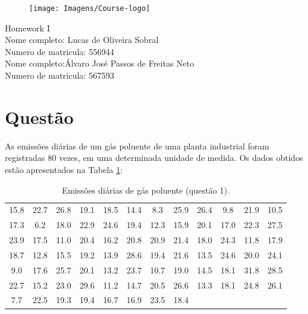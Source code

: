 \documentclass[a4paper,11pt]{article}
\begin{document}
\begin{figure}[!h] \texttt{[image: Imagens/Course-logo]} \end{figure}

\begin{spacing}{1.5}
{\Large\sc \noindent Homework I} \\

{\large\sc \noindent Nome completo: Lucas de Oliveira Sobral}\\
{\large\sc \noindent Numero de matricula: 556944}\\
{\large\sc \noindent Nome completo:Álvaro José Passos de Freitas Neto}\\
{\large\sc \noindent Numero de matricula: 567593}
\end{spacing}

\vskip1cm

\section{Questão}  \label{sec:q1}
As emissões diárias de um gás poluente de uma planta industrial foram registradas 80
vezes, em uma determinada unidade de medida. Os dados obtidos estão apresentados na
Tabela \ref{tab:ex1}:

\begin{table}[h]
    \centering
    \begin{tabular}{*{12}{c}} %
        15.8 & 22.7 & 26.8 & 19.1 & 18.5 & 14.4 & 8.3 & 25.9 & 26.4 & 9.8 & 21.9 & 10.5 \\
        17.3 & 6.2 & 18.0 & 22.9 & 24.6 & 19.4 & 12.3 & 15.9 & 20.1 & 17.0 & 22.3 & 27.5 \\
        23.9 & 17.5 & 11.0 & 20.4 & 16.2 & 20.8 & 20.9 & 21.4 & 18.0 & 24.3 & 11.8 & 17.9 \\
        18.7 & 12.8 & 15.5 & 19.2 & 13.9 & 28.6 & 19.4 & 21.6 & 13.5 & 24.6 & 20.0 & 24.1 \\
        9.0 & 17.6 & 25.7 & 20.1 & 13.2 & 23.7 & 10.7 & 19.0 & 14.5 & 18.1 & 31.8 & 28.5 \\
        22.7 & 15.2 & 23.0 & 29.6 & 11.2 & 14.7 & 20.5 & 26.6 & 13.3 & 18.1 & 24.8 & 26.1 \\
        7.7 & 22.5 & 19.3 & 19.4 & 16.7 & 16.9 & 23.5 & 18.4 
    \end{tabular}
    \caption{Emissões diárias de gás poluente (questão 1).} %
    \label{tab:ex1}
\end{table}
\end{document}
